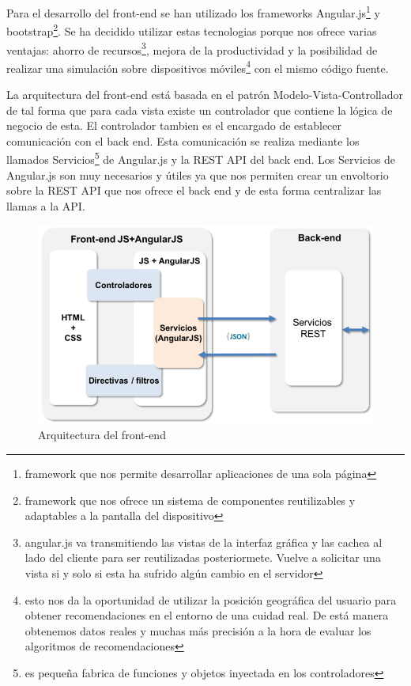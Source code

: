 Para el desarrollo del front-end se han utilizado los frameworks Angular.js\footnote{framework que nos permite desarrollar aplicaciones de una sola página} y bootstrap\footnote{framework que nos ofrece un sistema de componentes reutilizables y adaptables a la pantalla del dispositivo}. Se ha decidido utilizar estas tecnologias porque nos ofrece varias ventajas: ahorro de recursos\footnote{angular.js va transmitiendo las vistas de la interfaz gráfica y las cachea al lado del cliente para ser reutilizadas posteriormete. Vuelve a solicitar una vista si y solo si esta ha sufrido algún cambio en el servidor}, mejora de la productividad y la posibilidad de realizar una simulación sobre dispositivos móviles\footnote{esto nos da la oportunidad de utilizar la posición geográfica del usuario para obtener recomendaciones en el entorno de una cuidad real. De está manera obtenemos datos reales y muchas más precisión a la hora de evaluar los algoritmos de recomendaciones} con el mismo código fuente.

La arquitectura del front-end está basada en el patrón Modelo-Vista-Controllador de tal forma que para cada vista existe un controlador que contiene la lógica de negocio de esta. El controlador tambien es el encargado de establecer comunicación con el back end. Esta comunicación se realiza mediante los llamados Servicios\footnote{es pequeña fabrica de funciones y objetos inyectada en los controladores} de Angular.js y la REST API del back end. Los Servicios de Angular.js son muy necesarios y útiles ya que nos permiten crear un envoltorio sobre la REST API que nos ofrece el back end y de esta forma centralizar las llamas a la API.

\begin{figure}[H]
\centering\includegraphics[scale=0.7]{imagenes/arquitectura-front-end.png}
\caption{Arquitectura del front-end}
\label{arquitecturaFrontEnd}
\end{figure}

